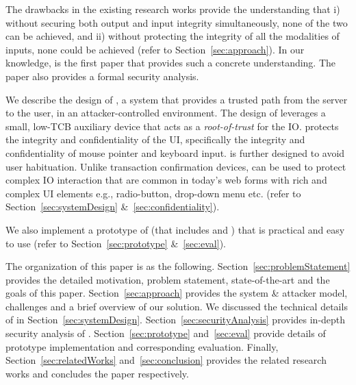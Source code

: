 

\begin{mybullet}
  \item The drawbacks in the existing research works provide the understanding that i) without securing both output and input integrity simultaneously, none of the two can be achieved, and ii) without protecting the integrity of all the modalities of inputs, none could be achieved (refer to Section~\ref{sec:approach}). In our knowledge, \name is the first paper that provides such a concrete understanding. The paper also provides a formal security analysis. 
  \item We describe the design of \name, a system that provides a  trusted path from the server to the user, in an attacker-controlled environment. The design of \name leverages a small, low-TCB auxiliary device that acts as a \emph{root-of-trust} for the IO. \name protects the integrity and confidentiality of the UI, specifically the integrity and confidentiality of mouse pointer and keyboard input. \name is further designed to avoid user habituation. Unlike transaction confirmation devices, \name can be used to protect complex IO interaction that are common in today's web forms with rich and complex UI elements e.g., radio-button, drop-down menu etc. (refer to Section~\ref{sec:systemDesign} \&~\ref{sec:confidentiality}).
  \item We also implement a prototype of \name (that includes \device and \name \js) that is practical and easy to use (refer to Section~\ref{sec:prototype} \&~\ref{sec:eval}).
\end{mybullet}


 The organization of this paper is as the following. Section~\ref{sec:problemStatement} provides the detailed motivation, problem statement, state-of-the-art and the goals of this paper. Section~\ref{sec:approach} provides the system \& attacker model, challenges and a brief overview of our solution. We discussed the technical details of \name in Section~\ref{sec:systemDesign}. Section~\ref{sec:securityAnalysis} provides in-depth security analysis of \name. Section~\ref{sec:prototype} and~\ref{sec:eval} provide details of \name prototype implementation and corresponding evaluation. Finally, Section~\ref{sec:relatedWorks} and~\ref{sec:conclusion} provides the related research works and concludes the paper respectively.

 